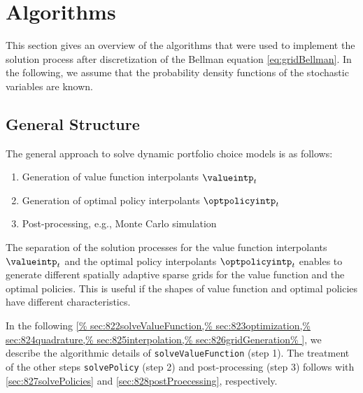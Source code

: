 \section{Algorithms}
\label{sec:82algorithms}


\noindent
This section gives an overview of the algorithms that
were used to implement the solution process after discretization of
the Bellman equation \eqref{eq:gridBellman}.
In the following, we assume that the probability density functions of the
stochastic variables are known.



\subsection{General Structure}
\label{sec:821generalStructure}

The general approach to solve dynamic portfolio choice models is as follows:
\begin{enumerate}
  \item
  Generation of value function interpolants $\valueintp_t$
  
  \item
  Generation of optimal policy interpolants $\optpolicyintp_t$
  
  \item
  Post-processing, e.g., Monte Carlo simulation
\end{enumerate}
The separation of the solution processes for
the value function interpolants $\valueintp_t$
and the optimal policy interpolants $\optpolicyintp_t$
enables to generate different spatially adaptive sparse grids
for the value function and the optimal policies.
This is useful if the shapes of value function and optimal policies
have different characteristics.

In the following \cref{%
  sec:822solveValueFunction,%
  sec:823optimization,%
  sec:824quadrature,%
  sec:825interpolation,%
  sec:826gridGeneration%
}, we describe the algorithmic details of
\texttt{solveValueFunction} (step 1).
The treatment of the other steps \texttt{solvePolicy} (step 2) and
post-processing (step 3) follows with
\cref{sec:827solvePolicies} and \cref{sec:828postProecessing},
respectively.


